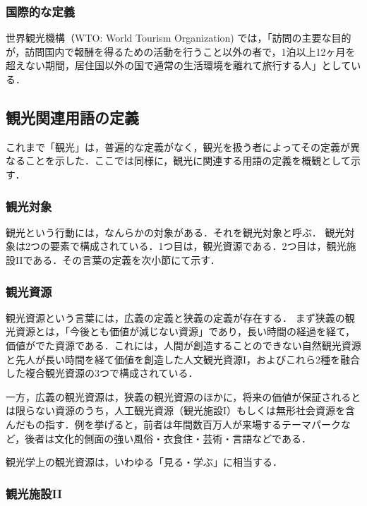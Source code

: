 \documentclass{jsarticle}
\begin{document}
\subsubsection{国際的な定義}

世界観光機構（WTO: World Tourism Organization) では，「訪問の主要な目的が，訪問国内で報酬を得るための活動を行うこと以外の者で，1泊以上12ヶ月を超えない期間，居住国以外の国で通常の生活環境を離れて旅行する人」としている\cite{wto}．

\subsection{観光関連用語の定義}

これまで「観光」は，普遍的な定義がなく，観光を扱う者によってその定義が異なることを示した．ここでは同様に，観光に関連する用語の定義を概観として示す．

\subsubsection{観光対象}

観光という行動には，なんらかの対象がある．それを観光対象と呼ぶ\cite{yokomizo_1998}．
観光対象は2つの要素で構成されている．1つ目は，観光資源である．2つ目は，観光施設IIである．その言葉の定義を次小節にて示す．

\subsubsection{観光資源}

観光資源という言葉には，広義の定義と狭義の定義が存在する．
まず狭義の観光資源とは，「今後とも価値が減じない資源」であり，長い時間の経過を経て，価値がでた資源である．これには，人間が創造することのできない自然観光資源と先人が長い時間を経て価値を創造した人文観光資源I，およびこれら2種を融合した複合観光資源の3つで構成されている．

一方，広義の観光資源は，狭義の観光資源のほかに，将来の価値が保証されるとは限らない資源のうち，人工観光資源（観光施設I）もしくは無形社会資源を含んだもの指す．例を挙げると，前者は年間数百万人が来場するテーマパークなど，後者は文化的側面の強い風俗・衣食住・芸術・言語などである．

観光学上の観光資源は，いわゆる「見る・学ぶ」に相当する．

\subsubsection{観光施設II}
\end{document}
